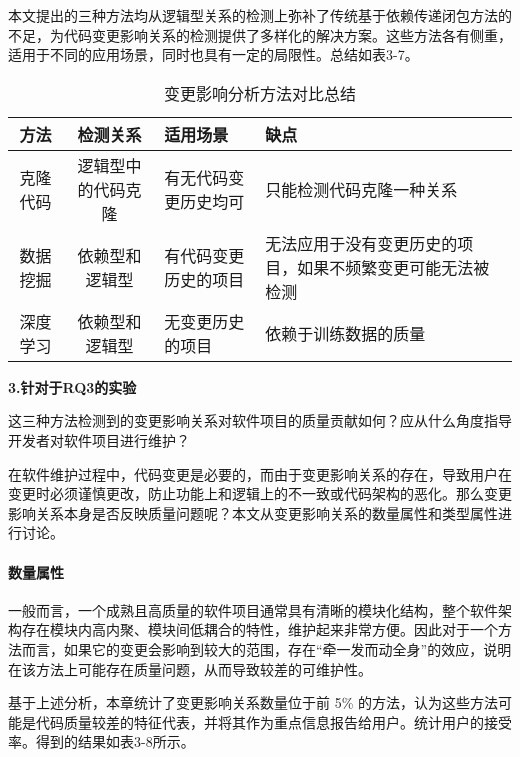 本文提出的三种方法均从逻辑型关系的检测上弥补了传统基于依赖传递闭包方法的不足，为代码变更影响关系的检测提供了多样化的解决方案。这些方法各有侧重，适用于不同的应用场景，同时也具有一定的局限性。总结如表3-7。

\begin{table}[htbp]
\caption{变更影响分析方法对比总结}
\vspace{0.5em}\centering\wuhao
\begin{tabular}{ccp{4cm}p{4cm}}
\toprule
方法& 检测关系 & 适用场景 & 缺点\\
\midrule
克隆代码 & 逻辑型中的代码克隆 & 有无代码变更历史均可 & 只能检测代码克隆一种关系\\
数据挖掘  & 依赖型和逻辑型 & 有代码变更历史的项目 & 无法应用于没有变更历史的项目，如果不频繁变更可能无法被检测 \\
深度学习  & 依赖型和逻辑型 & 无变更历史的项目 & 依赖于训练数据的质量 \\
\bottomrule
\end{tabular}
\end{table}


\textbf{3.针对于RQ3的实验}

这三种方法检测到的变更影响关系对软件项目的质量贡献如何？应从什么角度指导开发者对软件项目进行维护？

在软件维护过程中，代码变更是必要的，而由于变更影响关系的存在，导致用户在变更时必须谨慎更改，防止功能上和逻辑上的不一致或代码架构的恶化。那么变更影响关系本身是否反映质量问题呢？本文从变更影响关系的数量属性和类型属性进行讨论。

\paragraph{数量属性} 一般而言，一个成熟且高质量的软件项目通常具有清晰的模块化结构，整个软件架构存在模块内高内聚、模块间低耦合的特性，维护起来非常方便。因此对于一个方法而言，如果它的变更会影响到较大的范围，存在“牵一发而动全身”的效应，说明在该方法上可能存在质量问题，从而导致较差的可维护性。

基于上述分析，本章统计了变更影响关系数量位于前 5\% 的方法，认为这些方法可能是代码质量较差的特征代表，并将其作为重点信息报告给用户。统计用户的接受率。得到的结果如表3-8所示。

